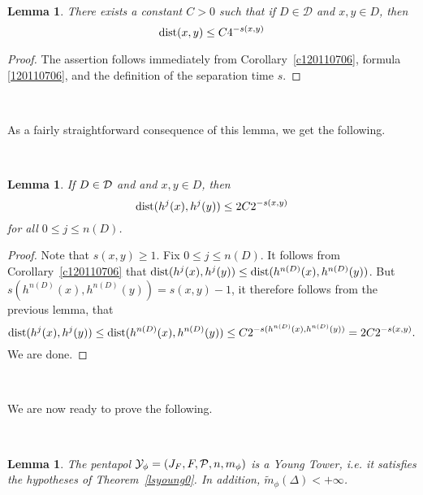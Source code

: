 \documentclass[12pt]{amsart}
\numberwithin{equation}{section}
\newcommand{\blem}{\begin{lem}}
\newcommand{\elem}{\end{lem}}
\newtheorem{lem}[thm]{Lemma}
\def\dist{\text{{\rm dist}}}  \def\Dist{\text{{\rm Dist}}}
\def\De{\Delta}               \def\e{\varepsilon}          \def\f{\phi}
\begin{document}
\

\blem\label{l220110705}
There exists a constant $C>0$ such that if $D\in\mathcal D$ and $x,y\in D$, then
$$
\dist(x,y)\le C4^{-s(x,y)}
$$
\elem

\begin{proof}
The assertion follows immediately from Corollary~\ref{c120110706},
formula \eqref{120110706}, and the definition of the separation time $s$. 
\end{proof}

\

\fr As a fairly straightforward consequence of this lemma, we get the
following.

\

\blem\label{l320110705}
If $D\in\mathcal D$ and  and $x,y\in D$, then
$$
\dist(h^j(x),h^j(y))\le 2C2^{-s(x,y)}
$$
for all $0\le j\le n(D)$.
\elem

\begin{proof}
Note that $s(x,y)\ge 1$. Fix $0\le j\le n(D)$. It follows from
Corollary~\ref{c120110706} that
$\dist(h^j(x),h^j(y))\le\dist(h^{n(D)}(x),h^{n(D)}(y))$. But
$s(h^{n(D)}(x),h^{n(D)}(y))=s(x,y)-1$, it therefore follows from the 
previous lemma, that
$$
\dist(h^j(x),h^j(y))
\le\dist(h^{n(D)}(x),h^{n(D)}(y))
\le C2^{-s(h^{n(D)}(x),h^{n(D)}(y))}
=   2C2^{-s(x,y)}.
$$
We are done. 
\end{proof}

\

\fr We are now ready to prove the following.

\

\blem\label{l120110707}
The pentapol $\mathcal Y_\phi=(J_F,F,{\mathcal P},n,m_\phi)$ is a Young
Tower, i.e. it satisfies the hypotheses of Theorem~\ref{lsyoung0}. In
addition, $\tilde m_\phi(\De)<+\infty$.
\elem
\end{document}
